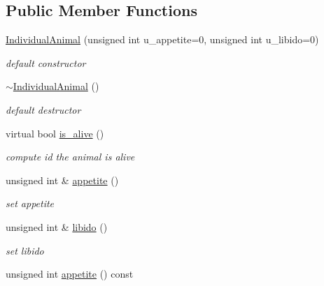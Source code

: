\subsection*{Public Member Functions}
\begin{DoxyCompactItemize}
\item 
\hyperlink{classIndividualAnimal_a44ab68443a3df25e11ec525a42782d43}{IndividualAnimal} (unsigned int u\_\-appetite=0, unsigned int u\_\-libido=0)
\begin{DoxyCompactList}\small\item\em default constructor \end{DoxyCompactList}\item 
\hyperlink{classIndividualAnimal_a145f082f37b866b1b36c4efd44e06900}{$\sim$IndividualAnimal} ()
\begin{DoxyCompactList}\small\item\em default destructor \end{DoxyCompactList}\item 
\hypertarget{classIndividualAnimal_a78960ddab5b3649638ba6b97238edc06}{
virtual bool \hyperlink{classIndividualAnimal_a78960ddab5b3649638ba6b97238edc06}{is\_\-alive} ()}
\label{classIndividualAnimal_a78960ddab5b3649638ba6b97238edc06}

\begin{DoxyCompactList}\small\item\em compute id the animal is alive \end{DoxyCompactList}\item 
\hypertarget{classIndividualAnimal_adedd04efd80eea6cb721e830c545fe54}{
unsigned int \& \hyperlink{classIndividualAnimal_adedd04efd80eea6cb721e830c545fe54}{appetite} ()}
\label{classIndividualAnimal_adedd04efd80eea6cb721e830c545fe54}

\begin{DoxyCompactList}\small\item\em set appetite \end{DoxyCompactList}\item 
\hypertarget{classIndividualAnimal_a128b28bad2036c848c0d7525d366c7da}{
unsigned int \& \hyperlink{classIndividualAnimal_a128b28bad2036c848c0d7525d366c7da}{libido} ()}
\label{classIndividualAnimal_a128b28bad2036c848c0d7525d366c7da}

\begin{DoxyCompactList}\small\item\em set libido \end{DoxyCompactList}\item 
\hypertarget{classIndividualAnimal_a38f21a847bdd5c01c782ea0192f27c57}{
unsigned int \hyperlink{classIndividualAnimal_a38f21a847bdd5c01c782ea0192f27c57}{appetite} () const }
\label{classIndividualAnimal_a38f21a847bdd5c01c782ea0192f27c57}


\end{DoxyCompactItemize}
